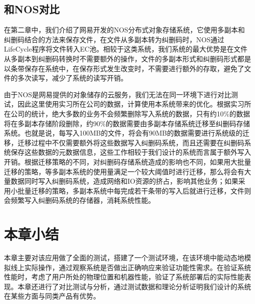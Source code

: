 \subsection{和NOS对比}%
在第二章中，我们介绍了网易开发的NOS分布式对象存储系统，它使用多副本和纠删码结合的方法来保存文件，在文件从多副本转为纠删码时，NOS通过LifeCycle程序将文件转入EC池。相较于这类系统，我们系统的最大优势是在文件从多副本到纠删码转换时不需要额外的操作，文件的多副本形式和纠删码形式都是以条带保存在系统中，在保存形式发生改变时，不需要进行额外的存取，避免了文件的多次读写，减少了系统的读写开销。

由于NOS是网易提供的对象储存的云服务，我们无法在同一环境下进行对比测试，因此这里使用实习所在公司的数据，计算使用本系统带来的优化。根据实习所在公司的统计，绝大多数的业务不会频繁删除写入系统的数据，只有约10$\%$的数据将在多副本存储阶段删除，约90$\%$的数据需要由多副本存储系统迁移至纠删码存储系统。也就是说，每写入100MB的文件，将会有90MB的数据需要进行系统级的迁移，迁移过程中不仅需要额外将这些数据写入纠删码系统，而且还需要在纠删码系统保存这些数据的元数据信息，这些工作相较于我们设计的系统而言属于额外写入开销。根据迁移策略的不同，对纠删码存储系统造成的影响也不同，如果用大批量迁移的策略，等多副本系统的使用量满足一个较大阈值时进行迁移，那么将会有大量数据同时写入纠删码系统，造成网络和IO资源的挤占，影响其他业务；如果采用小批量迁移的策略，多副本系统中每完成若干条带的写入后就进行迁移，文件则会频繁写入纠删码系统的存储器，消耗系统性能。

\section{本章小结}%
本章主要对该应用做了全面的测试，搭建了一个测试环境，在该环境中能动态地模拟线上实际操作，通过观察系统是否做出正确响应来验证功能性需求。在验证系统性能时，考虑了用户所处的物理位置和机器性能，验证了系统部署后的实际性能表现。本章还进行了对比测试与分析，通过测试数据和理论分析证明我们设计的系统在某些方面与同类产品有优势。
